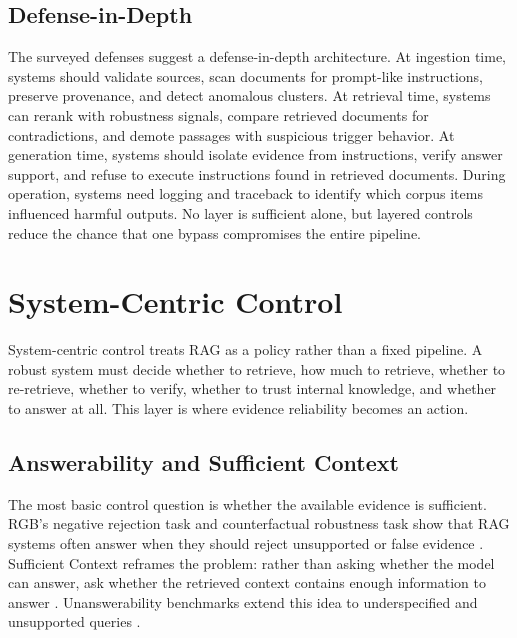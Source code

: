 \documentclass[11pt]{article}
\begin{document}
\subsection{Defense-in-Depth}

The surveyed defenses suggest a defense-in-depth architecture. At ingestion time, systems should validate sources, scan documents for prompt-like instructions, preserve provenance, and detect anomalous clusters. At retrieval time, systems can rerank with robustness signals, compare retrieved documents for contradictions, and demote passages with suspicious trigger behavior. At generation time, systems should isolate evidence from instructions, verify answer support, and refuse to execute instructions found in retrieved documents. During operation, systems need logging and traceback to identify which corpus items influenced harmful outputs. No layer is sufficient alone, but layered controls reduce the chance that one bypass compromises the entire pipeline.

\section{System-Centric Control}
\label{sec:control}

System-centric control treats RAG as a policy rather than a fixed pipeline. A robust system must decide whether to retrieve, how much to retrieve, whether to re-retrieve, whether to verify, whether to trust internal knowledge, and whether to answer at all. This layer is where evidence reliability becomes an action.




\subsection{Answerability and Sufficient Context}

The most basic control question is whether the available evidence is sufficient. RGB's negative rejection task and counterfactual robustness task show that RAG systems often answer when they should reject unsupported or false evidence \citep{rgb2023}. Sufficient Context reframes the problem: rather than asking whether the model can answer, ask whether the retrieved context contains enough information to answer \citep{sufficientContext2024}. Unanswerability benchmarks extend this idea to underspecified and unsupported queries \citep{rrag111,rrag141}.
\end{document}
